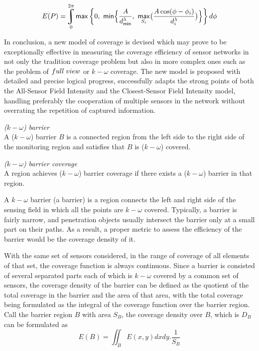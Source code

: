 $$E(P) = \uint\limits_0^{2\pi}{\mathsf{max}\left\{0,\ \mathsf{min}\Big\{\frac{A}{d_{\mathsf{min}}^\lambda}, \ \underset{S_i}{\mathsf{max}}\big(\frac{A\cos(\phi - \phi_i)}{d_i^\lambda}\big)\Big\}\right\}d\phi}$$

In conclusion, a new model of coverage is devised which may prove to be exceptionally effective in measuring the coverage efficiency of sensor networks in not only the tradition coverage problem but also in more complex ones such as the problem of $full\hspace{1mm}view$ or $k-\omega$ coverage. The new model is proposed with detailed and precise logical progress, successfully adapts the strong points of both the All-Sensor Field Intensity and the Closest-Sensor Field Intensity model, handling preferably the cooperation of multiple sensors in the network without overrating the repetition of captured information.


\begin{df}{\itshape($k-\omega$) barrier}\\
	A ($k-\omega$) barrier $B$ is a connected region from the left side to the right side of the monitoring region and satisfies that $B$ is ($k-\omega$) covered.
\end{df}
\begin{df}{\itshape($k-\omega$) barrier coverage}\\
	A region achieves ($k-\omega$) barrier coverage if there exists a ($k-\omega$) barrier in that region.\par
\end{df}

A $k-\omega$ barrier (a barrier) is a region connects the left and right side of the sensing field in which all the points are $k-\omega$ covered. Typically, a barrier is fairly narrow, and penetration objects usually intersect the barrier only at a small part on their paths. As a result, a proper metric to assess the efficiency of the barrier would be the coverage density of it.

With the same set of sensors considered, in the range of coverage of all elements of that set, the coverage function is always continuous. Since a barrier is consisted of several separated parts each of which is $k-\omega$ covered by a common set of sensors, the coverage density of the barrier can be defined as the quotient of the total coverage in the barrier and the area of that area, with the total coverage being formulated as the integral of the coverage function over the barrier region. Call the barrier region $B$ with area $S_B$, the coverage density over $B$, which is $D_B$ can be formulated as
\begin{equation}
\label{eq5}
E(B) = \iint_B{E(x, y)dxdy}.\frac{1}{S_B}
\end{equation}

